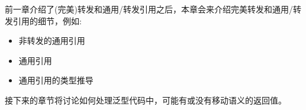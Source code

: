 前一章介绍了(完美)转发和通用/转发引用之后，本章会来介绍完美转发和通用/转发引用的细节，例如:\par

\begin{itemize}
	\item 非转发的通用引用
	\item 通用引用
	\item 通用引用的类型推导
\end{itemize}

接下来的章节将讨论如何处理泛型代码中，可能有或没有移动语义的返回值。\par
















